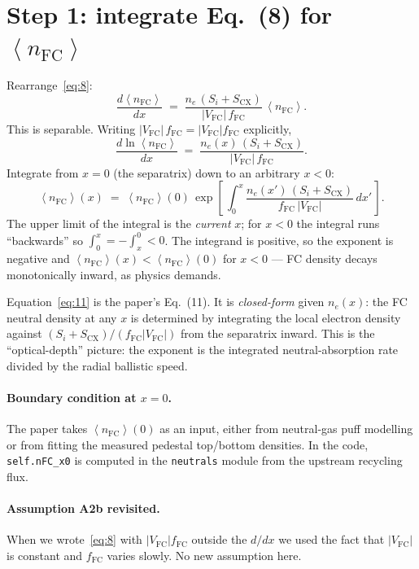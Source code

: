 \documentclass[11pt]{article}
\renewcommand{\ne}{n_{e}}  %
\newcommand{\nfc}{n_{\mathrm{FC}}}
\newcommand{\Vfc}{\lvert V_{\mathrm{FC}}\rvert}
\newcommand{\Si}{S_{i}}
\newcommand{\Scx}{S_{\mathrm{CX}}}
\newcommand{\fFC}{f_{\mathrm{FC}}}
\newcommand{\fsa}[1]{\left\langle #1 \right\rangle}
\newcommand{\nFCzero}{\fsa{\nfc}(0)}
\newcommand{\Afactor}{\Vfc\,\fFC}
\begin{document}
\section{Step 1: integrate Eq.~(8) for $\fsa{\nfc}$}
\label{sec:integrate-fc}

Rearrange~\eqref{eq:8}:
\begin{equation}
  \frac{d\fsa{\nfc}}{dx} \;=\; \frac{\ne\,(\Si+\Scx)}{\Afactor}\,\fsa{\nfc}.
\end{equation}
This is separable.  Writing $\Afactor=\Vfc\fFC$ explicitly,
\begin{equation}
  \frac{d\ln\fsa{\nfc}}{dx} \;=\; \frac{\ne(x)\,(\Si+\Scx)}{\Vfc\,\fFC}.
\end{equation}
Integrate from $x=0$ (the separatrix) down to an arbitrary $x<0$:
\begin{equation}
  \boxed{\;
    \fsa{\nfc}(x) \;=\; \nFCzero \,
      \exp\!\left[\,\int_{0}^{x}\!\frac{\ne(x')\,(\Si+\Scx)}{\fFC\,\Vfc}\,dx'\,\right].
  \;}
  \label{eq:11}
\end{equation}
The upper limit of the integral is the \emph{current} $x$; for $x<0$
the integral runs ``backwards'' so $\int_{0}^{x}=-\int_{x}^{0}<0$.  The
integrand is positive, so the exponent is negative and
$\fsa{\nfc}(x)<\nFCzero$ for $x<0$ --- FC density decays monotonically
inward, as physics demands.

Equation~\eqref{eq:11} is the paper's Eq.~(11).  It is \emph{closed-form}
given $\ne(x)$: the FC neutral density at any $x$ is determined by
integrating the local electron density against $(\Si+\Scx)/(\fFC\Vfc)$
from the separatrix inward.  This is the ``optical-depth'' picture: the
exponent is the integrated neutral-absorption rate divided by the radial
ballistic speed.

\paragraph{Boundary condition at $x=0$.}  The paper takes
$\nFCzero$ as an input, either from neutral-gas puff modelling or from
fitting the measured pedestal top/bottom densities.  In the code,
\texttt{self.nFC\_x0} is computed in the \texttt{neutrals} module from
the upstream recycling flux.

\paragraph{Assumption A2b revisited.}  When we wrote~\eqref{eq:8} with
$\Vfc\fFC$ outside the $d/dx$ we used the fact that $\Vfc$ is constant
and $\fFC$ varies slowly.  No new assumption here.
\end{document}
